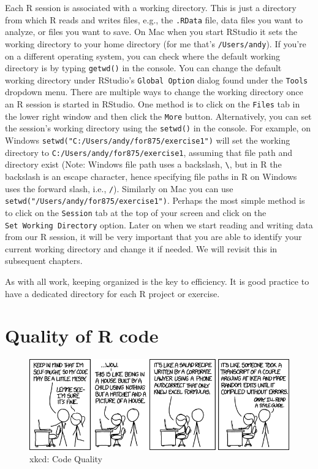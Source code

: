 \documentclass[
]{krantz}
\begin{document}
Each R session is associated with a working directory. This is just a directory from which R reads and writes files, e.g., the \texttt{.RData} file, data files you want to analyze, or files you want to save. On Mac when you start RStudio it sets the working directory to your home directory (for me that's \texttt{/Users/andy}). If you're on a different operating system, you can check where the default working directory is by typing \texttt{getwd()} in the console. You can change the default working directory under RStudio's \verb+Global Option+ dialog found under the \texttt{Tools} dropdown menu. There are multiple ways to change the working directory once an R session is started in RStudio. One method is to click on the \texttt{Files} tab in the lower right window and then click the \texttt{More} button. Alternatively, you can set the session's working directory using the \texttt{setwd()} in the console. For example, on Windows \texttt{setwd("C:/Users/andy/for875/exercise1")} will set the working directory to \texttt{C:/Users/andy/for875/exercise1}, assuming that file path and directory exist (Note: Windows file path uses a backslash, \texttt{\textbackslash{}}, but in R the backslash is an escape character, hence specifying file paths in R on Windows uses the forward slash, i.e., \texttt{/}). Similarly on Mac you can use \texttt{setwd("/Users/andy/for875/exercise1")}. Perhaps the most simple method is to click on the \texttt{Session} tab at the top of your screen and click on the \texttt{Set\ Working\ Directory} option. Later on when we start reading and writing data from our R session, it will be very important that you are able to identify your current working directory and change it if needed. We will revisit this in subsequent chapters.

As with all work, keeping organized is the key to efficiency. It is good practice to have a dedicated directory for each R project or exercise.

\hypertarget{quality-of-r-code}{%
\section{Quality of R code}\label{quality-of-r-code}}

\begin{figure}
\includegraphics[width=1\linewidth]{../figures/code_quality} \caption{xkcd: Code Quality}\label{fig:comic}
\end{figure}
\end{document}
